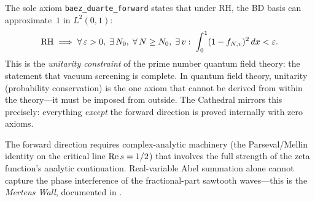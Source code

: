 \documentclass[11pt,a4paper]{article}
\begin{document}
\begin{remark}
The sole axiom \texttt{baez\_duarte\_forward} states that under RH,
the BD basis can approximate~$1$ in $L^2(0,1)$:
\[
  \mathrm{RH} \implies \forall\,\varepsilon > 0,\; \exists\, N_0,\;
  \forall\, N \geq N_0,\; \exists\, v :\;
  \int_0^1 (1 - f_{N,v})^2\,dx < \varepsilon.
\]
This is the \emph{unitarity constraint} of the prime number quantum
field theory: the statement that vacuum screening is complete. In quantum
field theory, unitarity (probability conservation) is the one axiom that
cannot be derived from within the theory---it must be imposed from
outside. The Cathedral mirrors this precisely: everything \emph{except}
the forward direction is proved internally with zero axioms.

The forward direction requires complex-analytic machinery
(the Parseval/Mellin identity on the critical line $\operatorname{Re} s = 1/2$)
that involves the full strength of the zeta function's analytic
continuation. Real-variable Abel summation alone cannot capture the
phase interference of the fractional-part sawtooth waves---this is
the \emph{Mertens Wall}, documented in .
\end{remark}
\end{document}
